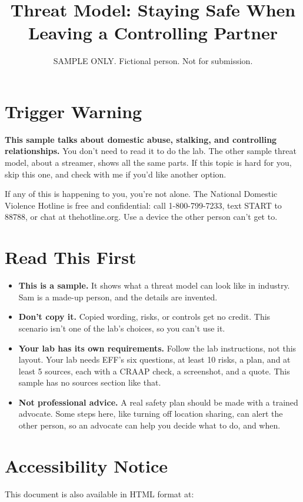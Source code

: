 \documentclass[11pt]{article}
\title{Threat Model: Staying Safe When Leaving a Controlling Partner}
\author{SAMPLE ONLY. Fictional person. Not for submission.}
\date{\vspace{-5ex}}
\begin{document}
\maketitle

\section*{Trigger Warning}
\textbf{This sample talks about domestic abuse, stalking, and controlling relationships.} You don't need to read it to do the lab. The other sample threat model, about a streamer, shows all the same parts. If this topic is hard for you, skip this one, and check with me if you'd like another option.

If any of this is happening to you, you're not alone. The National Domestic Violence Hotline is free and confidential: call 1-800-799-7233, text START to 88788, or chat at thehotline.org. Use a device the other person can't get to.

\section*{Read This First}
\begin{itemize}
    \item \textbf{This is a sample.} It shows what a threat model can look like in industry. Sam is a made-up person, and the details are invented.
    \item \textbf{Don't copy it.} Copied wording, risks, or controls get no credit. This scenario isn't one of the lab's choices, so you can't use it.
    \item \textbf{Your lab has its own requirements.} Follow the lab instructions, not this layout. Your lab needs EFF's six questions, at least 10 risks, a plan, and at least 5 sources, each with a CRAAP check, a screenshot, and a quote. This sample has no sources section like that.
    \item \textbf{Not professional advice.} A real safety plan should be made with a trained advocate. Some steps here, like turning off location sharing, can alert the other person, so an advocate can help you decide what to do, and when.
\end{itemize}

\section*{Accessibility Notice}
This document is also available in HTML format at:
\end{document}
